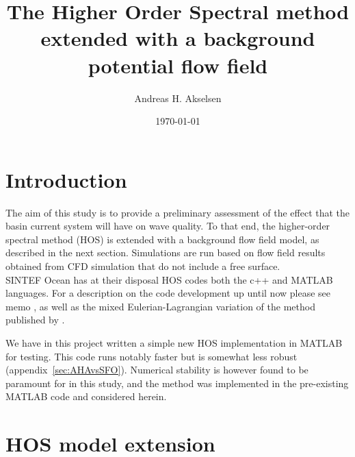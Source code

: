 \documentclass[a4paper,12pt]{article}
\newcommand{\mr}{\mathrm}
\let\SSS\S
\renewcommand{\S}{^\mr{S}}
\renewcommand{\_}[1]{_\mr{#1}}
\begin{document}
\title{The Higher Order Spectral method extended with a background potential flow field}
\author{Andreas H. Akselsen}
\date{\today}
\maketitle

\tableofcontents

\section{Introduction}
The aim of this study is to provide a preliminary assessment of the effect that the basin current system will have on wave quality. To that end, the higher-order spectral method (HOS) is extended with a background flow field model, as described in the next section. Simulations are run based on flow field results obtained from CFD simulation that do not include a free surface.\\

SINTEF Ocean has at their disposal HOS codes both the c++ and MATLAB languages.
For a description on the code development up until now please see memo \citet{SFo2018_HOS}, as well as the mixed Eulerian-Lagrangian variation of the method published by \citep{fouques2020mixedHOS}.


We have in this project written a simple new HOS implementation in MATLAB for testing. This code runs notably faster but is somewhat less robust (appendix~\ref{sec:AHAvsSFO}).
Numerical stability is however found to be paramount for in this study, and the method was implemented in the pre-existing MATLAB code and considered herein. 







\section{HOS model extension}
\label{sec:model}
\end{document}
